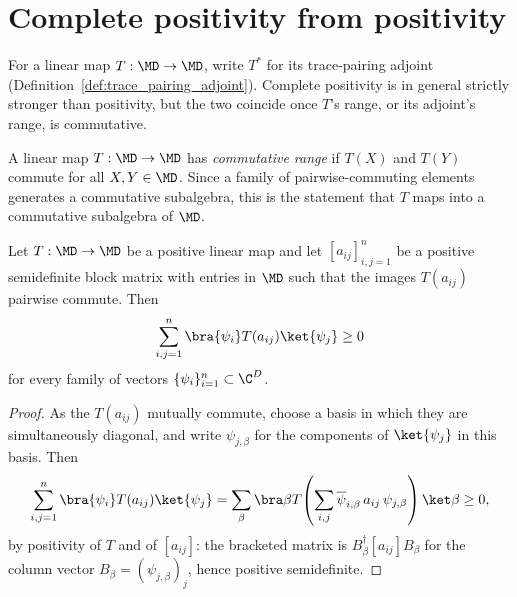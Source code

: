 \section{Complete positivity from positivity}

For a linear map $T:\MD\to\MD$, write $T^*$ for its trace-pairing adjoint
(Definition~\ref{def:trace_pairing_adjoint}). Complete positivity is in
general strictly stronger than positivity, but the two coincide once $T$'s
range, or its adjoint's range, is commutative.

\begin{definition}\label{def:commutative_range}
    \leanok
    A linear map $T:\MD\to\MD$ has \emph{commutative range} if $T(X)$ and
    $T(Y)$ commute for all $X,Y\in\MD$. Since a family of pairwise-commuting
    elements generates a commutative subalgebra, this is the statement that
    $T$ maps into a commutative subalgebra of $\MD$.
\end{definition}

\begin{lemma}
    \label{lem:block_quadratic_form_nonneg_commuting}
    \leanok
    Let $T:\MD\to\MD$ be a positive linear map and let $[a_{ij}]_{i,j=1}^n$
    be a positive semidefinite block matrix with entries in $\MD$ such that
    the images $T(a_{ij})$ pairwise commute. Then
    \begin{align}
        \sum_{i,j=1}^{n}\bra{\psi_i}T(a_{ij})\ket{\psi_j}\ge 0
        \notag
    \end{align}
    for every family of vectors $\{\psi_i\}_{i=1}^n\subset\C^D$.
\end{lemma}

\begin{proof}\leanok
    As the $T(a_{ij})$ mutually commute, choose a basis in which they are
    simultaneously diagonal, and write $\psi_{j,\beta}$ for the components
    of $\ket{\psi_j}$ in this basis. Then
    \begin{align}
        \sum_{i,j=1}^{n}\bra{\psi_i}T(a_{ij})\ket{\psi_j}
        = \sum_\beta\bra\beta
          T\!\left(\sum_{i,j}\overline{\psi}_{i,\beta}\,a_{ij}\,\psi_{j,\beta}\right)
          \ket\beta \ge 0,
        \notag
    \end{align}
    by positivity of $T$ and of $[a_{ij}]$: the bracketed matrix is
    $B_\beta^\dagger[a_{ij}]B_\beta$ for the column vector
    $B_\beta=(\psi_{j,\beta})_j$, hence positive semidefinite.
\end{proof}


